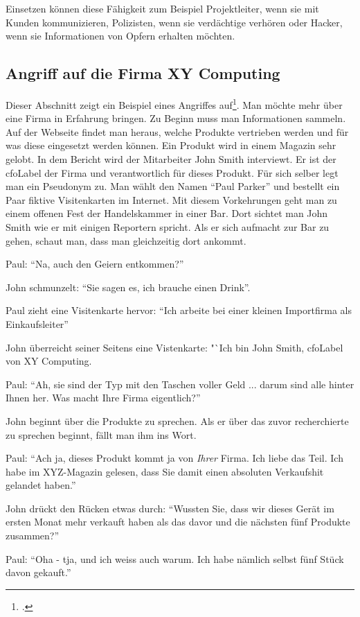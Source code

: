 Einsetzen können diese Fähigkeit zum Beispiel Projektleiter, wenn sie mit Kunden kommunizieren, Polizisten, wenn sie verdächtige verhören oder Hacker, wenn sie Informationen von Opfern erhalten möchten.

\subsection{Angriff auf die Firma XY Computing}
Dieser Abschnitt zeigt ein Beispiel eines Angriffes auf\footcite{human_hacking}. Man möchte mehr über eine Firma in Erfahrung bringen. Zu Beginn muss man Informationen sammeln. Auf der Webseite findet man heraus, welche Produkte vertrieben werden und für was diese eingesetzt werden können. Ein Produkt wird in einem Magazin sehr gelobt. In dem Bericht wird der Mitarbeiter John Smith interviewt. Er ist der \Gls{cfoLabel} der Firma und verantwortlich für dieses Produkt.
Für sich selber legt man ein Pseudonym zu. Man wählt den Namen "`Paul Parker"' und bestellt ein Paar fiktive Visitenkarten im Internet. 
Mit diesem Vorkehrungen geht man zu einem offenen Fest der Handelskammer in einer Bar. Dort sichtet man John Smith wie er mit einigen Reportern spricht. Als er sich aufmacht zur Bar zu gehen, schaut man, dass man gleichzeitig dort ankommt. 

Paul: "`Na, auch den Geiern entkommen?"'

John schmunzelt: "`Sie sagen es, ich brauche einen Drink"'.

Paul zieht eine Visitenkarte hervor: "`Ich arbeite bei einer kleinen Importfirma als Einkaufsleiter"'

John überreicht seiner Seitens eine Vistenkarte: "`Ich bin John Smith, \Gls{cfoLabel} von XY Computing.

Paul: "`Ah, sie sind der Typ mit den Taschen voller Geld ... darum sind alle hinter Ihnen her. Was macht Ihre Firma eigentlich?"'

John beginnt über die Produkte zu sprechen. Als er über das zuvor recherchierte zu sprechen beginnt, fällt man ihm ins Wort.

Paul: "`Ach ja, dieses Produkt kommt ja von \textit{Ihrer} Firma. Ich liebe das Teil. Ich habe im XYZ-Magazin gelesen, dass Sie damit einen absoluten Verkaufshit gelandet haben."'

John drückt den Rücken etwas durch: "`Wussten Sie, dass wir dieses Gerät im ersten Monat mehr verkauft haben als das davor und die nächsten fünf Produkte zusammen?"'

Paul: "`Oha - tja, und ich weiss auch warum. Ich habe nämlich selbst fünf Stück davon gekauft."'

